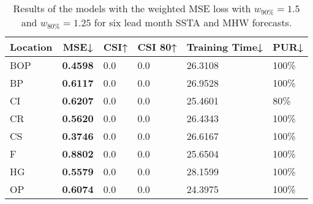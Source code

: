 \documentclass[11pt, a4paper]{article}
\begin{document}
\begin{table}[H]
\centering
\small
\caption{Results of the models with the weighted MSE loss with $w_{90\%}=1.5$ and $w_{80\%}=1.25$ for six lead month SSTA and MHW forecasts.}
\begin{tabular}{llllll}
\multicolumn{1}{c}{\textbf{Location}} & \multicolumn{1}{c}{\textbf{MSE↓}} & \multicolumn{1}{c}{\textbf{CSI↑}} & \multicolumn{1}{c}{\textbf{CSI 80↑}} & \multicolumn{1}{c}{\textbf{Training Time↓}} & \multicolumn{1}{c}{\textbf{PUR↓}} \\ \hline
BOP                         & \textbf{0.4598}                   & 0.0                               & 0.0                                  & 26.3108                                     & 100\%                             \\
BP                        & \textbf{0.6117}                   & 0.0                               & 0.0                                  & 26.9528                                     & 100\%                             \\
CI                        & \textbf{0.6207}                   & 0.0                               & 0.0                                  & 25.4601                                     & 80\%                              \\
CR                           & \textbf{0.5620}                   & 0.0                               & 0.0                                  & 26.4343                                     & 100\%                             \\
CS                           & \textbf{0.3746}                   & 0.0                               & 0.0                                  & 26.6167                                     & 100\%                             \\
F                             & \textbf{0.8802}                   & 0.0                               & 0.0                                  & 25.6504                                     & 100\%                             \\
HG                          & \textbf{0.5579}                   & 0.0                               & 0.0                                  & 28.1599                                     & 100\%                             \\
OP                       & \textbf{0.6074}                   & 0.0                               & 0.0                                  & 24.3975                                     & 100\%                             \\

\end{tabular}
\end{table}
\end{document}
